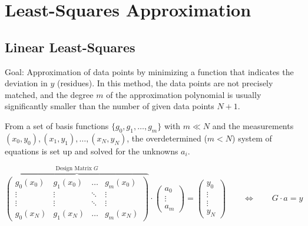 \section{Least-Squares Approximation}
\subsection{Linear Least-Squares}
Goal: Approximation of data points by minimizing a function that indicates the deviation in \(y\) (residues).
In this method, the data points are not precisely matched, and the degree \(m\) of the approximation
polynomial is usually significantly smaller than the number of given data points \(N+1\).

From a set of basis functions \(\{g_0, g_1, \ldots, g_m\}\) with \(m \ll N\) and
the measurements \((x_0, y_0), (x_1, y_1), \ldots, (x_N, y_N)\),
the overdetermined (\(m < N\)) system of equations is set up and solved for the unknowns \(a_i\).

\[
    \overbrace{
    \begin{pmatrix}
        g_0(x_0) & g_1(x_0) & \ldots & g_m(x_0) \\
        \vdots & \vdots & \ddots & \vdots \\
        \vdots & \vdots & \ddots & \vdots \\
        g_0(x_N) & g_1(x_N) & \ldots & g_m(x_N)
    \end{pmatrix}}^{\text{Design Matrix } G}
    \cdot
    \begin{pmatrix}
        a_0 \\ \vdots \\ a_m
    \end{pmatrix}
    =
    \begin{pmatrix}
        y_0 \\ \vdots \\ \vdots \\ y_N
    \end{pmatrix}
    \qquad
    \Leftrightarrow
    \qquad
    G \cdot a = y
\]


